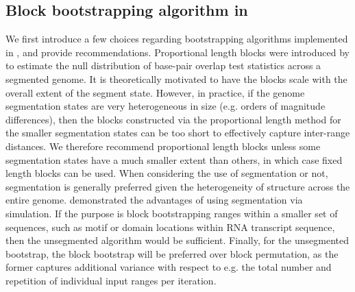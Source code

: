 \documentclass{article}
\begin{document}
\subsection{Block bootstrapping algorithm in \bootranges}\label{sec:algorithm}

We first introduce a few choices regarding bootstrapping
  algorithms implemented in \bootranges, and provide recommendations.
  Proportional length blocks were introduced by
  \citet{bickel2010subsampling} to estimate the null distribution of
  base-pair overlap test statistics across a segmented genome. It is
  theoretically motivated to have the blocks scale with the overall
  extent of the segment state. However, in practice, if the genome
  segmentation states are very heterogeneous in size (e.g. orders of magnitude
  differences), then the blocks constructed via the proportional
  length method for the smaller segmentation states can be too short
  to effectively capture inter-range distances. We therefore recommend
  proportional length blocks unless some segmentation states have a
  much smaller extent than others, in which case fixed length blocks
  can be used.
  When considering the use of segmentation or not, segmentation is
  generally preferred given the heterogeneity of structure across the
  entire genome.
  \citet{bickel2010subsampling} demonstrated the advantages of using
  segmentation via simulation.
  If the purpose is block bootstrapping ranges within a smaller set of
  sequences, such as motif or domain locations within RNA transcript
  sequence, then the unsegmented algorithm would be sufficient. 
  Finally, for the unsegmented bootstrap, the block bootstrap will be
  preferred over block permutation, as the former captures additional
  variance with respect to e.g. the total number and repetition of
  individual input ranges per iteration.
\end{document}
